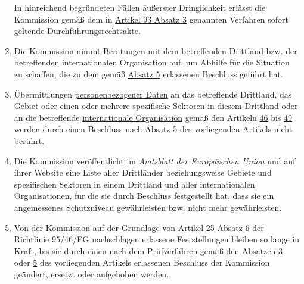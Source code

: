 \begin{enumerate}
   In hinreichend begründeten Fällen äußerster Dringlichkeit erlässt die Kommission gemäß dem in \hyperref[itm:93-3]
   {Artikel 93 Absatz 3} genannten Verfahren sofort geltende Durchführungsrechtsakte.

  \item Die Kommission nimmt Beratungen mit dem betreffenden Drittland bzw. der betreffenden internationalen
   Organisation auf, um Abhilfe für die Situation zu schaffen, die zu dem gemäß \hyperref[itm:45-5]{Absatz 5}
   erlassenen Beschluss geführt hat.%
  \label{itm:45-6}

  \item Übermittlungen \hyperref[itm:04-1]{personenbezogener Daten} an das betreffende Drittland, das Gebiet oder einen
   oder mehrere spezifische Sektoren in diesem Drittland oder an die betreffende \hyperref[itm:04-26]
   {internationale Organisation} gemäß den Artikeln
   \hyperref[ch:46]{46} bis \hyperref[ch:49]{49} werden durch einen Beschluss nach \hyperref[itm:45-5]{Absatz 5 des
    vorliegenden Artikels} nicht berührt.%
  \label{itm:45-7}

  \item Die Kommission veröffentlicht im \emph{Amtsblatt der Europäischen Union} und auf ihrer Website eine Liste aller
   Drittländer beziehungsweise Gebiete und spezifischen Sektoren in einem Drittland und aller internationalen
   Organisationen, für die sie durch Beschluss festgestellt hat, dass sie ein angemessenes Schutzniveau gewährleisten
   bzw. nicht mehr gewährleisten.   %
  \label{itm:45-8}

  \item Von der Kommission auf der Grundlage von Artikel 25 Absatz 6 der Richtlinie 95/46/EG\todo
   {nachschlagen} erlassene Feststellungen bleiben so lange in Kraft, bis sie durch einen nach dem Prüfverfahren gemäß
   den Absätzen \hyperref[itm:45-3]{3} oder \hyperref[itm:45-5]{5} des vorliegenden Artikels erlassenen Beschluss der
   Kommission geändert, ersetzt oder aufgehoben werden.%
  \label{itm:45-9}

\end{enumerate}


